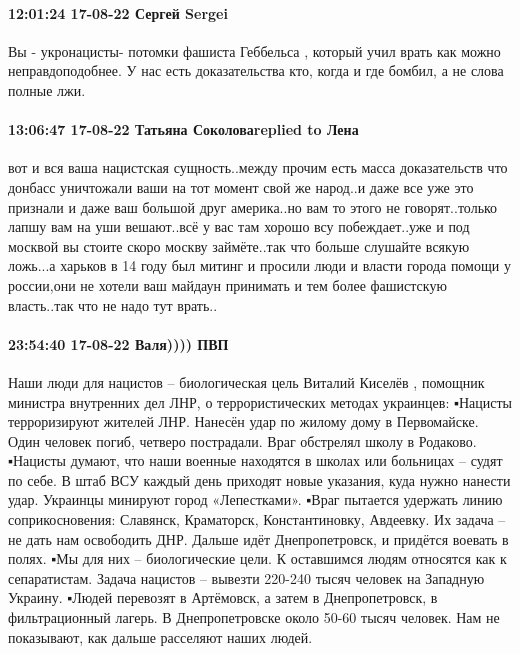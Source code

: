  
 
 
 
 

\paragraph{12:01:24 17-08-22 Сергей Sergei}

Вы - укронацисты- потомки фашиста Геббельса , который учил врать как можно
неправдоподобнее. У нас есть доказательства кто, когда и где бомбил, а не слова
полные лжи.

\paragraph{13:06:47 17-08-22 Татьяна Соколоваreplied to Лена}

вот и вся ваша нацистская сущность..между прочим есть масса доказательств что
донбасс уничтожали ваши на тот момент свой же народ..и даже все уже это
признали и даже ваш большой друг америка..но вам то этого не говорят..только
лапшу вам на уши вешают..всё у вас там хорошо всу побеждает..уже и под москвой
вы стоите скоро москву займёте..так что больше слушайте всякую ложь...а харьков
в 14 году был митинг и просили люди и власти города помощи у россии,они не
хотели ваш майдаун принимать и тем более фашистскую власть..так что не надо тут
врать..

\paragraph{23:54:40 17-08-22 Валя)))) ПВП}

Наши люди для нацистов – биологическая цель
Виталий Киселёв , помощник министра внутренних дел ЛНР, о террористических методах украинцев:
▪️Нацисты терроризируют жителей ЛНР. Нанесён удар по жилому дому в Первомайске. Один человек погиб, четверо пострадали. Враг обстрелял школу в Родаково.
▪️Нацисты думают, что наши военные находятся в школах или больницах – судят по себе. В штаб ВСУ каждый день приходят новые указания, куда нужно нанести удар. Украинцы минируют город «Лепестками».
▪️Враг пытается удержать линию соприкосновения: Славянск, Краматорск, Константиновку, Авдеевку. Их задача – не дать нам освободить ДНР. Дальше идёт Днепропетровск, и придётся воевать в полях.
▪️Мы для них – биологические цели. К оставшимся людям относятся как к сепаратистам. Задача нацистов – вывезти 220-240 тысяч человек на Западную Украину.
▪️Людей перевозят в Артёмовск, а затем в Днепропетровск, в фильтрационный лагерь. В Днепропетровске около 50-60 тысяч человек. Нам не показывают, как дальше расселяют наших людей.

